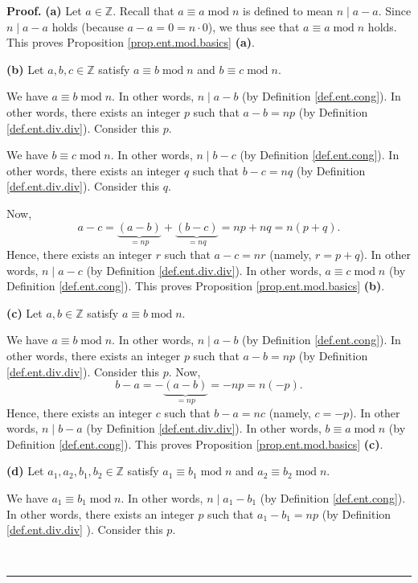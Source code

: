 \documentclass[numbers=enddot,12pt,final,onecolumn,notitlepage]{scrartcl}%
\numberwithin{exer}{subsection}
\theoremstyle{definition}
\newenvironment{proof}[1][Proof]{\noindent\textbf{#1.} }{\ \rule{0.5em}{0.5em}}
\begin{document}
\begin{proof}
\textbf{(a)} Let $a\in\mathbb{Z}$. Recall that $a\equiv a\operatorname{mod}n$
is defined to mean $n\mid a-a$. Since $n\mid a-a$ holds (because
$a-a=0=n\cdot0$), we thus see that $a\equiv a\operatorname{mod}n$ holds. This
proves Proposition \ref{prop.ent.mod.basics} \textbf{(a)}.

\textbf{(b)} Let $a,b,c\in\mathbb{Z}$ satisfy $a\equiv b\operatorname{mod}n$
and $b\equiv c\operatorname{mod}n$.

We have $a\equiv b\operatorname{mod}n$. In other words, $n\mid a-b$ (by
Definition \ref{def.ent.cong}). In other words, there exists an integer $p$
such that $a-b=np$ (by Definition \ref{def.ent.div.div}). Consider this $p$.

We have $b\equiv c\operatorname{mod}n$. In other words, $n\mid b-c$ (by
Definition \ref{def.ent.cong}). In other words, there exists an integer $q$
such that $b-c=nq$ (by Definition \ref{def.ent.div.div}). Consider this $q$.

Now,
\[
a-c=\underbrace{\left(  a-b\right)  }_{=np}+\underbrace{\left(  b-c\right)
}_{=nq}=np+nq=n\left(  p+q\right)  .
\]
Hence, there exists an integer $r$ such that $a-c=nr$ (namely, $r=p+q$). In
other words, $n\mid a-c$ (by Definition \ref{def.ent.div.div}). In other
words, $a\equiv c\operatorname{mod}n$ (by Definition \ref{def.ent.cong}). This
proves Proposition \ref{prop.ent.mod.basics} \textbf{(b)}.

\textbf{(c)} Let $a,b\in\mathbb{Z}$ satisfy $a\equiv b\operatorname{mod}n$.

We have $a\equiv b\operatorname{mod}n$. In other words, $n\mid a-b$ (by
Definition \ref{def.ent.cong}). In other words, there exists an integer $p$
such that $a-b=np$ (by Definition \ref{def.ent.div.div}). Consider this $p$.
Now,%
\[
b-a=-\underbrace{\left(  a-b\right)  }_{=np}=-np=n\left(  -p\right)  .
\]
Hence, there exists an integer $c$ such that $b-a=nc$ (namely, $c=-p$). In
other words, $n\mid b-a$ (by Definition \ref{def.ent.div.div}). In other
words, $b\equiv a\operatorname{mod}n$ (by Definition \ref{def.ent.cong}). This
proves Proposition \ref{prop.ent.mod.basics} \textbf{(c)}.

\textbf{(d)} Let $a_{1},a_{2},b_{1},b_{2}\in\mathbb{Z}$ satisfy $a_{1}\equiv
b_{1}\operatorname{mod}n$ and $a_{2}\equiv b_{2}\operatorname{mod}n$.

We have $a_{1}\equiv b_{1}\operatorname{mod}n$. In other words, $n\mid
a_{1}-b_{1}$ (by Definition \ref{def.ent.cong}). In other words, there exists
an integer $p$ such that $a_{1}-b_{1}=np$ (by Definition \ref{def.ent.div.div}%
). Consider this $p$.


\end{proof}
\end{document}

